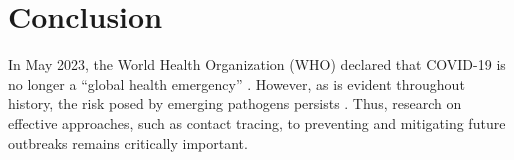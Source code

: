 \chapter{Conclusion}





In May 2023, the World Health Organization (WHO) declared that COVID-19 is no longer a ``global health emergency'' \citep{Wise2023}. However, as is evident throughout history, the risk posed by emerging pathogens persists \citep{Piret2021, Tabish2022}. Thus, research on effective approaches, such as contact tracing, to preventing and mitigating future outbreaks remains critically important.







